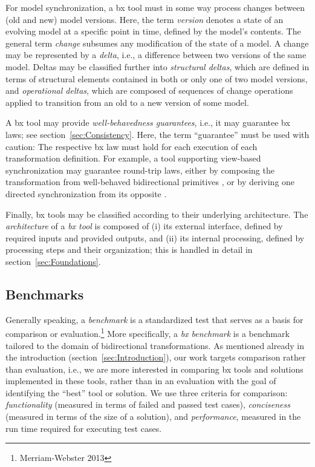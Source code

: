 For model synchronization, a bx tool must in some way process changes between (old and new) model versions. Here, the term \emph{version} denotes a state of an evolving model at a specific point in time, defined by the model's contents. 
The general term \emph{change} subsumes any modification of the state of a model. 
A change may be represented by a \emph{delta}, i.e., a difference between two versions of the same model. 
Deltas may be classified further into \emph{structural deltas}, which are defined in terms of structural elements contained in both or only one of two model versions, and \emph{operational deltas}, which are composed of sequences of change operations applied to transition from an old to a new version of some model.

A bx tool may provide \emph{well-behavedness guarantees}, i.e., it may guarantee bx laws; see section~\ref{sec:Consistency}. 
Here, the term ``guarantee'' must be used with caution: The respective bx law must hold for each execution of each transformation definition. 
For example, a tool supporting view-based synchronization may guarantee round-trip laws, either by composing the transformation from well-behaved bidirectional primitives \cite{TOPLAS2007-Foster}, or by deriving one directed synchronization from its opposite \cite{PEPM2016-Ko}.

Finally, bx tools may be classified according to their underlying architecture. 
The \emph{architecture} of a \emph{bx tool} is composed of (i) its external interface, defined by required inputs and provided outputs, and (ii) its internal processing, defined by processing steps and their organization; this is handled in detail in section~\ref{sec:Foundations}.  

\subsection{Benchmarks}
\label{sec:Benchmarks}

Generally speaking, a \emph{benchmark} is a standardized test that serves as a basis for comparison or evaluation.\footnote{Merriam-Webster 2013} 
More specifically, a \emph{bx benchmark} is a benchmark tailored to the domain of bidirectional transformations. As mentioned already in the introduction (section~\ref{sec:Introduction}), our work targets comparison rather than evaluation, i.e., we are more interested in comparing bx tools and solutions implemented in these tools, rather than in an evaluation with the goal of identifying the ``best'' tool or solution. 
We use three criteria for comparison: \emph{functionality} (measured in terms of failed and passed test cases), \emph{conciseness} (measured in terms of the size of a solution), and \emph{performance}, measured in the run time required for executing test cases.
